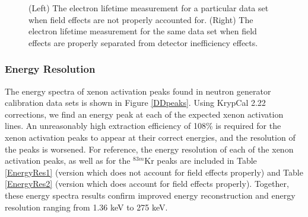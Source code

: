 \documentclass[a4paper,12pt]{article}
\begin{document}
{\begin{figure} [h!]
\centering
{}
\qquad
{}
\caption{ (Left) The electron lifetime measurement for a particular data set when field effects are not properly accounted for. (Right) The electron lifetime measurement for the same data set when field effects are properly separated from detector inefficiency effects.}
\label{LifetimeCompare}
\end{figure}


\subsubsection{Energy Resolution}

The energy spectra of xenon activation peaks found in neutron generator calibration data sets is shown in Figure \ref{DDpeaks}.  Using KrypCal 2.22 corrections, we find an energy peak at each of the expected xenon activation lines.  An unreasonably high extraction efficiency of 108\% is required for the xenon activation peaks to appear at their correct energies, and the resolution of the peaks is worsened.  For reference, the energy resolution of each of the xenon activation peaks, as well as for the $^{83m}$Kr peaks are included in Table \ref{EnergyRes1} (version which does not account for field effects properly) and Table \ref{EnergyRes2} (version which does account for field effects properly). Together, these energy spectra results confirm improved energy reconstruction and energy resolution ranging from 1.36 keV to 275 keV.  

}
\end{document}
